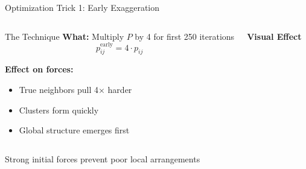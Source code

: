 \documentclass[aspectratio=169]{beamer}
\begin{document}
\begin{frame}{Optimization Trick 1: Early Exaggeration}
\begin{columns}
\begin{block}{The Technique}
\textbf{What:} Multiply $P$ by 4 for first 250 iterations
$$p_{ij}^{\text{early}} = 4 \cdot p_{ij}$$

\textbf{Effect on forces:}
\begin{itemize}
\item True neighbors pull 4× harder
\item Clusters form quickly
\item Global structure emerges first
\end{itemize}
\end{block}

\begin{center}
\textbf{Visual Effect}\\[3mm]

\end{center}
\end{columns}

\vspace{3mm}
\begin{center}
\colorbox{green!20}{\parbox{0.85\textwidth}{\centering
Strong initial forces prevent poor local arrangements}}
\end{center}
\end{frame}
\end{document}
